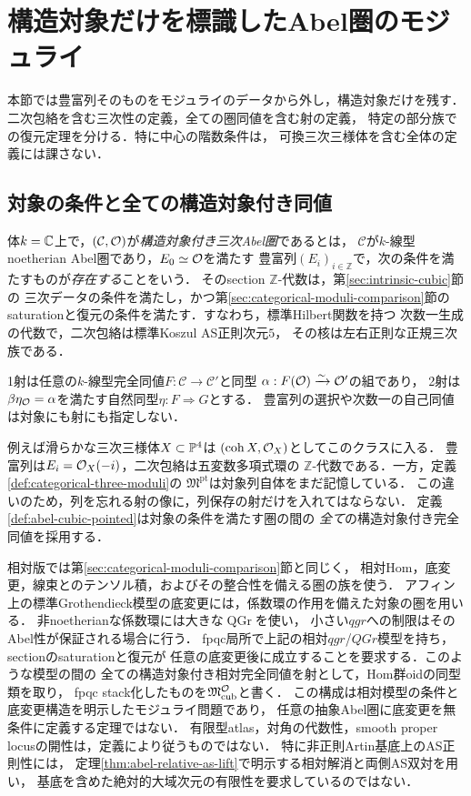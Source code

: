 \section{構造対象だけを標識したAbel圏のモジュライ}
\label{sec:abel-marked-moduli}

本節では豊富列そのものをモジュライのデータから外し，構造対象だけを残す．
二次包絡を含む三次性の定義，全ての圏同値を含む射の定義，
特定の部分族での復元定理を分ける．特に中心の階数条件は，
可換三次三様体を含む全体の定義には課さない．

\subsection{対象の条件と全ての構造対象付き同値}
\label{subsec:abel-cubic-definition}

\begin{definition}[構造対象付き三次Abel圏]
\label{def:abel-cubic-pointed}
体$k=\mathbb C$上で，$(\mathcal C,\mathcal O)$が\emph{構造対象付き三次Abel圏}であるとは，
$\mathcal C$が$k$-線型noetherian Abel圏であり，$E_0\simeq\mathcal O$を満たす
豊富列$(E_i)_{i\in\mathbb Z}$で，次の条件を満たすものが\emph{存在する}ことをいう．
そのsection $\mathbb Z$-代数は，第\ref{sec:intrinsic-cubic}節の
三次データの条件を満たし，かつ第\ref{sec:categorical-moduli-comparison}節の
saturationと復元の条件を満たす．すなわち，標準Hilbert関数を持つ
次数一生成の代数で，二次包絡は標準Koszul AS正則次元$5$，
その核は左右正則な正規三次族である．

1射は任意の$k$-線型完全同値$F:\mathcal C\to\mathcal C'$と同型
$\alpha:F(\mathcal O)\xrightarrow{\sim}\mathcal O'$の組であり，
2射は$\beta\eta_{\mathcal O}=\alpha$を満たす自然同型$\eta:F\Rightarrow G$とする．
豊富列の選択や次数一の自己同値は対象にも射にも指定しない．
\end{definition}

例えば滑らかな三次三様体$X\subset\mathbb P^4$は
$(\operatorname{coh}X,\mathcal O_X)$としてこのクラスに入る．
豊富列は$E_i=\mathcal O_X(-i)$，二次包絡は五変数多項式環の
$\mathbb Z$-代数である．一方，定義\ref{def:categorical-three-moduli}の
$\mathfrak M^{\mathrm{pt}}$は対象列自体をまだ記憶している．
この違いのため，列を忘れる射の像に，列保存の射だけを入れてはならない．
定義\ref{def:abel-cubic-pointed}は対象の条件を満たす圏の間の
\emph{全て}の構造対象付き完全同値を採用する．

相対版では第\ref{sec:categorical-moduli-comparison}節と同じく，
相対Hom，底変更，線束とのテンソル積，およびその整合性を備える圏の族を使う．
アフィン上の標準Grothendieck模型の底変更には，係数環の作用を備えた対象の圏を用いる．
非noetherianな係数環には大きな$\operatorname{QGr}$を使い，
小さい$qgr$への制限はそのAbel性が保証される場合に行う．
fpqc局所で上記の相対$qgr$/$QGr$模型を持ち，sectionのsaturationと復元が
任意の底変更後に成立することを要求する．このような模型の間の
全ての構造対象付き相対完全同値を射として，Hom群oidの同型類を取り，
fpqc stack化したものを$\mathfrak M^{\mathcal O}_{\mathrm{cub}}$と書く．
この構成は相対模型の条件と底変更構造を明示したモジュライ問題であり，
任意の抽象Abel圏に底変更を無条件に定義する定理ではない．
有限型atlas，対角の代数性，smooth proper locusの開性は，定義により従うものではない．
特に非正則Artin基底上のAS正則性には，
定理\ref{thm:abel-relative-as-lift}で明示する相対解消と両側AS双対を用い，
基底を含めた絶対的大域次元の有限性を要求しているのではない．


